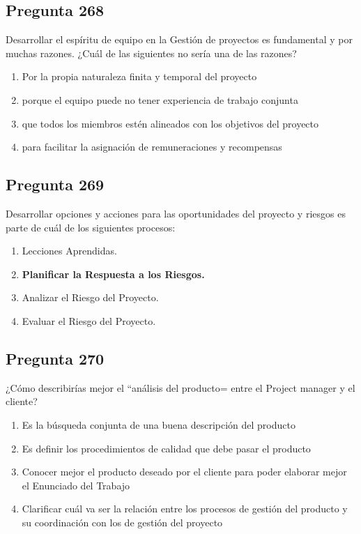 \documentclass[11pt,a4paper]{article}
\begin{document}
\subsection*{Pregunta 268}
Desarrollar el espíritu de equipo en la Gestión de proyectos es fundamental y por muchas razones. ¿Cuál de las siguientes no sería una de las razones?

\begin{enumerate}[label=\alph*)]
  \item Por la propia naturaleza finita y temporal del proyecto
  \item porque el equipo puede no tener experiencia de trabajo conjunta
  \item que todos los miembros estén alineados con los objetivos del proyecto
  \item para facilitar la asignación de remuneraciones y recompensas
\end{enumerate}

\subsection*{Pregunta 269}
Desarrollar opciones y acciones para las oportunidades del proyecto y riesgos es parte de cuál de los siguientes procesos:

\begin{enumerate}[label=\alph*)]
  \item Lecciones Aprendidas.
  \item \textbf{Planificar la Respuesta a los Riesgos.}
  \item Analizar el Riesgo del Proyecto.
  \item Evaluar el Riesgo del Proyecto.
\end{enumerate}

\subsection*{Pregunta 270}
¿Cómo describirías mejor el ``análisis del producto= entre el Project manager y el cliente?

\begin{enumerate}[label=\alph*)]
  \item Es la búsqueda conjunta de una buena descripción del producto
  \item Es definir los procedimientos de calidad que debe pasar el producto
  \item Conocer mejor el producto deseado por el cliente para poder elaborar mejor el Enunciado del Trabajo
  \item Clarificar cuál va ser la relación entre los procesos de gestión del producto y su coordinación con los de gestión del proyecto
\end{enumerate}
\end{document}
